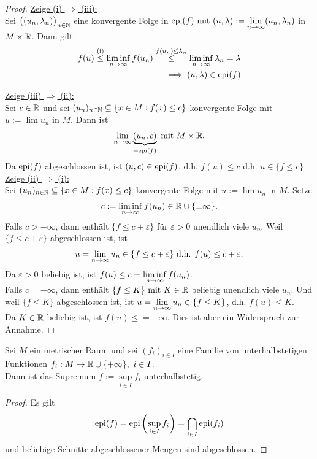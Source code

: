 \begin{proof}
\underline{Zeige (i) $\Rightarrow$ (iii):}\\
Sei $\big((u_n,\lambda_n)\big)_{n\in\mathbb{N}}$ eine konvergente Folge in $\text{epi}(f)\text{ mit }(u,\lambda):=\lim\limits_{n\to\infty}(u_n,\lambda_n)$ in $M\times\mathbb{R}$. Dann gilt:
\begin{align*}
f(u)
\stackrel{\text{(i)}}{\leq}
\liminf\limits_{n\to\infty} f(u_n)
\stackrel{f(u_n)\leq\lambda_n}{\leq}
\liminf\limits_{n\to\infty} \lambda_n
=\lambda\\
\implies
(u,\lambda)\in\text{epi}(f)
\end{align*}

\underline{Zeige (iii) $\Rightarrow$ (ii):}\\
Sei $c\in\mathbb{R}$ und sei $(u_n)_{n\in\mathbb{N}}\subseteq\lbrace x\in M:f(x)\leq c\rbrace$ konvergente Folge mit $u:=\lim u_n$ in $M$. Dann ist
\begin{align*}
\lim\limits_{n\to\infty}\underbrace{(u_n,c)}_{=\text{epi}(f)}\text{ mit } M\times\mathbb{R}.
\end{align*}
Da $\text{epi}(f)$ abgeschlossen ist, ist $(u,c)\in\text{epi}(f)$, d.h. $f(u)\leq c$ d.h. $u\in\lbrace f\leq c\rbrace$\\

\underline{Zeige (ii) $\Rightarrow$ (i):}\\
Sei $(u_n)_{n\in\mathbb{N}}\subseteq\lbrace x\in M:f(x)\leq c\rbrace$ konvergente Folge mit $u:=\lim u_n$ in $M$. Setze
\begin{align*}
c:=\liminf\limits_{n\to\infty} f(u_n)\in\mathbb{R}\cup\lbrace\pm\infty\rbrace.
\end{align*}
Falls $c>-\infty$, dann enthält $\lbrace f\leq c+\varepsilon\rbrace$ für $\varepsilon>0$ unendlich viele $u_n$. Weil $\lbrace f\leq c+\varepsilon\rbrace$ abgeschlossen ist, ist
\begin{align*}
u=\lim\limits_{n\to\infty} u_n\in\lbrace f\leq c+\varepsilon\rbrace\text{ d.h. } f(u)\leq c+\varepsilon.
\end{align*}
Da $\varepsilon>0$ beliebig ist, ist $f(u)\leq c=\liminf\limits\limits_{n\to\infty} f(u_n)$.\\
Falls $c=-\infty$, dann enthält $\lbrace f\leq K\rbrace\text{ mit } K\in\mathbb{R}$ beliebig unendlich viele $u_n$. Und weil $\lbrace f\leq K\rbrace$ abgeschlossen ist, ist $u=\lim\limits_{n\to\infty} u_n\in\lbrace f\leq K\rbrace$, d.h. $f(u)\leq K$.\\
Da $K\in\mathbb{R}$ beliebig ist, ist $f(u)\leq=-\infty$. Dies ist aber ein Widerspruch zur Annahme.
\end{proof}

\begin{lemma}
Sei $M$ ein metrischer Raum und sei $(f_i)_{i\in I}$ eine Familie von unterhalbstetigen Funktionen $f_i:M\to\mathbb{R}\cup\lbrace+\infty\rbrace,~i\in I$.\\
Dann ist das Supremum $f:=\sup\limits_{i\in I} f_i$ unterhalbstetig.
\end{lemma}
\begin{proof}
Es gilt
\begin{align*}
\text{epi}(f)=\text{epi}\left(\sup\limits_{i\in I} f_i\right)=\bigcap\limits_{i\in I}\text{epi}(f_i)
\end{align*}
und beliebige Schnitte abgeschlossener Mengen sind abgeschlossen.
\end{proof}


